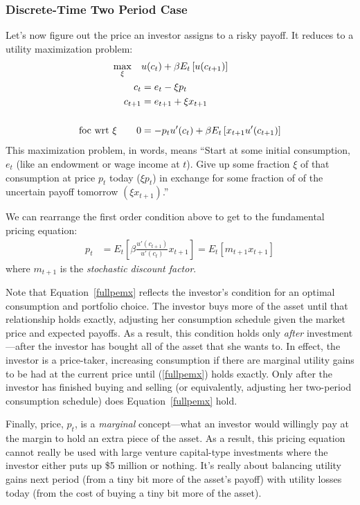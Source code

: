 \documentclass[12pt]{article}
\theoremstyle{plain}
\theoremstyle{definition}
\theoremstyle{remark}
\begin{document}
\subsubsection{Discrete-Time Two Period Case}

Let's now figure out the price an investor assigns to a risky
payoff.  It reduces to a utility maximization problem:
\begin{align}
    \max_{\xi} \quad &u(c_t) + \beta E_t\left[u(c_{t+1})\right]
    \label{foc}\\
    c_t &= e_t - \xi p_t  \notag\\
    c_{t+1} &= e_{t+1} + \xi x_{t+1} \notag\\\notag\\
    \text{foc wrt $\xi$} \qquad
    0 &= -p_t u'(c_t) + \beta E_t\left[ x_{t+1} u'(c_{t+1})\right]
    \notag
\end{align}
This maximization problem, in words, means ``Start at some initial
consumption, $e_t$ (like an endowment or wage income at $t$). Give up
some fraction $\xi$ of that consumption at price $p_t$ today ($\xi p_t$)
in exchange for some fraction of of the uncertain payoff tomorrow $(\xi
x_{t+1})$.''

We can rearrange the first order condition above to get to the
fundamental pricing equation:
\begin{align}
    p_t &= E_t\left[
	\beta\frac{u'(c_{t+1})}{u'(c_{t})} x_{t+1} \right]
    = E_t\left[ m_{t+1} x_{t+1} \right]
	\label{fullpemx}
\end{align}
where $m_{t+1}$ is the \emph{stochastic discount factor}.

Note that Equation~\ref{fullpemx} reflects the investor's condition for
an optimal consumption and portfolio choice. The investor buys more of
the asset until that relationship holds exactly, adjusting her
consumption schedule given the market price and expected payoffs. As a
result, this condition holds only \emph{after} investment---after the
investor has bought all of the asset that she wants to. In effect, the
investor is a price-taker, increasing consumption if there are marginal
utility gains to be had at the current price until (\ref{fullpemx})
holds exactly.  Only after the investor has finished buying and selling
(or equivalently, adjusting her two-period consumption schedule) does
Equation~\ref{fullpemx} hold.

Finally, price, $p_t$, is a \emph{marginal} concept---what an investor
would willingly pay at the margin to hold an extra piece of the asset.
As a result, this pricing equation cannot really be used with large
venture capital-type investments where the investor either puts up \$5
million or nothing. It's really about balancing utility gains next
period (from a tiny bit more of the asset's payoff) with utility losses
today (from the cost of buying a tiny bit more of the asset).
\end{document}
